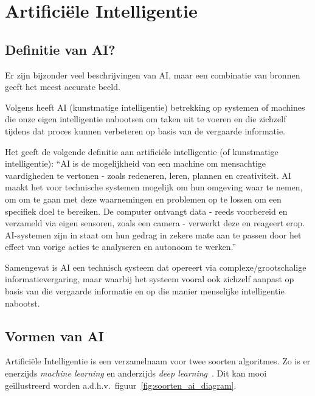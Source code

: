 \clearpage

\section{Artificiële Intelligentie}
\subsection{Definitie van AI?}
Er zijn bijzonder veel beschrijvingen van AI, maar een combinatie van bronnen geeft het meest accurate beeld.

Volgens \textcite{Oracle2014} heeft AI (kunstmatige intelligentie) betrekking op systemen of machines die onze eigen intelligentie nabootsen om taken uit te voeren en die zichzelf tijdens dat proces kunnen verbeteren op basis van de vergaarde informatie.

Het \textcite{EuropeesParlement2020} geeft de volgende definitie aan artificiële intelligentie (of kunstmatige intelligentie): ``AI is de mogelijkheid van een machine om mensachtige vaardigheden te vertonen - zoals redeneren, leren, plannen en creativiteit.
AI maakt het voor technische systemen mogelijk om hun omgeving waar te nemen, om om te gaan met deze waarnemingen en problemen op te lossen om een specifiek doel te bereiken. De computer ontvangt data - reeds voorbereid en verzameld via eigen sensoren, zoals een camera - verwerkt deze en reageert erop.
AI-systemen zijn in staat om hun gedrag in zekere mate aan te passen door het effect van vorige acties te analyseren en autonoom te werken.''

Samengevat is AI een technisch systeem dat opereert via complexe/grootschalige informatievergaring, maar waarbij het systeem vooral ook zichzelf aanpast op basis van die vergaarde informatie en op die manier menselijke intelligentie nabootst.

\subsection{Vormen van AI}
Artificiële Intelligentie is een verzamelnaam voor twee soorten algoritmes. Zo is er enerzijds \textit{machine learning} en anderzijds \textit{deep learning}~\autocite{Kavlakoglu2020}.
Dit kan mooi geïllustreerd worden a.d.h.v.\ figuur~\ref{fig:soorten_ai_diagram}.

